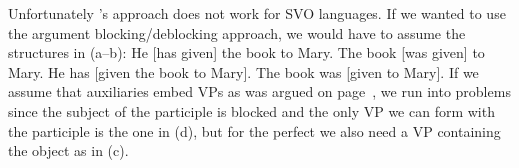 
\noindent
Unfortunately \citeauthor{Haider86}'s approach does not work for SVO languages. If we wanted to use
the argument blocking/deblocking approach, we would have to assume the structures in (a--b):
\eal
\ex He [has given] the book to Mary.
\ex The book [was given] to Mary.
\ex He has [given the book to Mary].
\ex The book was [given to Mary].
\zl
If we assume that auxiliaries embed VPs as was argued on page~\pageref{page-English-Aux-VPs}, we run
into problems since the subject of the participle is blocked and the only VP we can form with the
participle is the one in (d), but for the perfect we also need a VP containing the object as
in (c).












